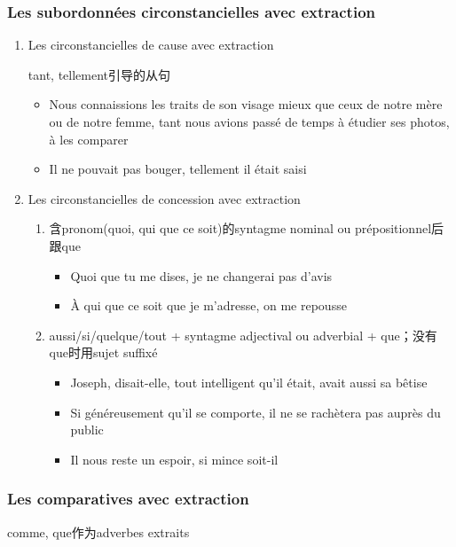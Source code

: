 \documentclass[UTF8]{report}
\begin{document}
\subsubsection{Les subordonnées circonstancielles avec extraction}
\begin{enumerate}
    \item Les circonstancielles de cause avec extraction
    
    tant, tellement引导的从句
    \begin{itemize}
        \item Nous connaissions les traits de son visage mieux que ceux de notre mère ou de notre femme, tant nous avions passé de temps à étudier ses photos, à les comparer
        \item Il ne pouvait pas bouger, tellement il était saisi
    \end{itemize}
    \item Les circonstancielles de concession avec extraction
    \begin{enumerate}
        \item 含pronom(quoi, qui que ce soit)的syntagme nominal ou prépositionnel后跟que
        \begin{itemize}
            \item Quoi que tu me dises, je ne changerai pas d’avis
            \item À qui que ce soit que je m’adresse, on me repousse
        \end{itemize}
        \item aussi/si/quelque/tout + syntagme adjectival ou adverbial + que；没有que时用sujet suffixé
        \begin{itemize}
            \item Joseph, disait-elle, tout intelligent qu’il était, avait aussi sa bêtise
            \item Si généreusement qu’il se comporte, il ne se rachètera pas auprès du public
            \item Il nous reste un espoir, si mince soit-il
        \end{itemize}
    \end{enumerate}
\end{enumerate}
\subsubsection{Les comparatives avec extraction}

comme, que作为adverbes extraits
\end{document}

